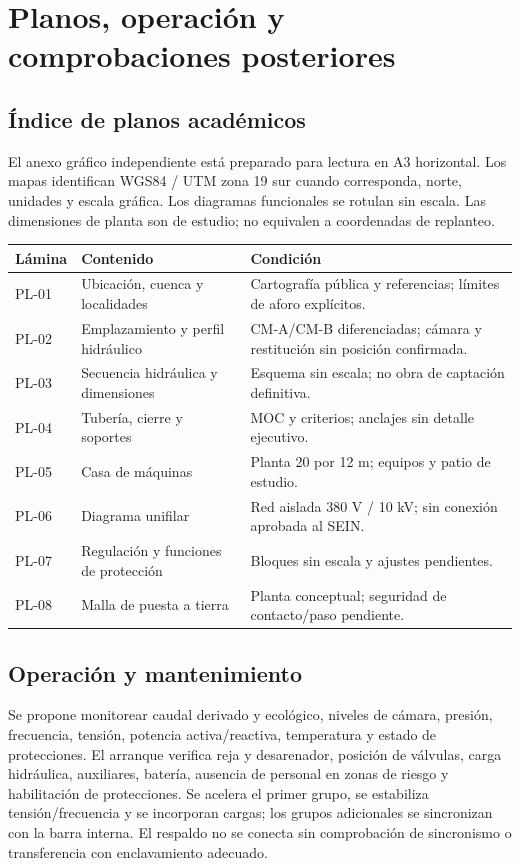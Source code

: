 \chapter{Planos, operación y comprobaciones posteriores}
\section{Índice de planos académicos}
El anexo gráfico independiente está preparado para lectura en A3 horizontal. Los mapas identifican WGS84 / UTM zona 19 sur cuando corresponda, norte, unidades y escala gráfica. Los diagramas funcionales se rotulan sin escala. Las dimensiones de planta son de estudio; no equivalen a coordenadas de replanteo.
\begin{longtable}{L{1.4cm}L{7.8cm}L{4.8cm}}\toprule Lámina & Contenido & Condición \\ \midrule
PL-01 & Ubicación, cuenca y localidades & Cartografía pública y referencias; límites de aforo explícitos.\\
PL-02 & Emplazamiento y perfil hidráulico & CM-A/CM-B diferenciadas; cámara y restitución sin posición confirmada.\\
PL-03 & Secuencia hidráulica y dimensiones & Esquema sin escala; no obra de captación definitiva.\\
PL-04 & Tubería, cierre y soportes & MOC y criterios; anclajes sin detalle ejecutivo.\\
PL-05 & Casa de máquinas & Planta 20 por 12 m; equipos y patio de estudio.\\
PL-06 & Diagrama unifilar & Red aislada 380 V / 10 kV; sin conexión aprobada al SEIN.\\
PL-07 & Regulación y funciones de protección & Bloques sin escala y ajustes pendientes.\\
PL-08 & Malla de puesta a tierra & Planta conceptual; seguridad de contacto/paso pendiente.\\ \bottomrule\end{longtable}

\section{Operación y mantenimiento}
Se propone monitorear caudal derivado y ecológico, niveles de cámara, presión, frecuencia, tensión, potencia activa/reactiva, temperatura y estado de protecciones. El arranque verifica reja y desarenador, posición de válvulas, carga hidráulica, auxiliares, batería, ausencia de personal en zonas de riesgo y habilitación de protecciones. Se acelera el primer grupo, se estabiliza tensión/frecuencia y se incorporan cargas; los grupos adicionales se sincronizan con la barra interna. El respaldo no se conecta sin comprobación de sincronismo o transferencia con enclavamiento adecuado.

